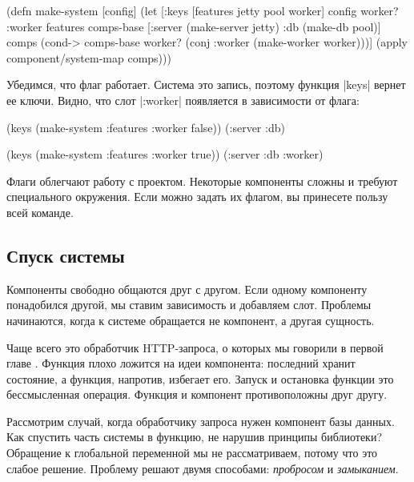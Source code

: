 \begin{english}
  \begin{clojure}
(defn make-system [config]
  (let [{:keys [features jetty pool worker]} config
        {worker? :worker} features
        comps-base [:server (make-server jetty)
                    :db (make-db pool)]
        comps (cond-> comps-base
                worker?
                (conj :worker (make-worker worker)))]
    (apply component/system-map comps)))
  \end{clojure}
\end{english}

Убедимся, что флаг работает. Система это запись, поэтому функция \spverb|keys|
вернет ее ключи. Видно, что слот \spverb|:worker| появляется в зависимости от
флага:

\begin{english}
  \begin{clojure}
(keys (make-system {:features {:worker false}}))
(:server :db)

(keys (make-system {:features {:worker true}}))
(:server :db :worker)
  \end{clojure}
\end{english}

Флаги облегчают работу с проектом. Некоторые компоненты сложны и требуют
специального окружения. Если можно задать их флагом, вы принесете пользу всей
команде.

\subsection{Спуск системы}

Компоненты свободно общаются друг с другом. Если одному компоненту понадобился
другой, мы ставим зависимость и добавляем слот. Проблемы начинаются, когда к
системе обращается не компонент, а другая сущность.

Чаще всего это обработчик HTTP-запроса, о которых мы говорили в первой
главе . Функция плохо ложится на идеи компонента: последний
хранит состояние, а функция, напротив, избегает его. Запуск и остановка функции
это бессмысленная операция. Функция и компонент противоположны друг другу.

Рассмотрим случай, когда обработчику запроса нужен компонент базы данных. Как
спустить часть системы в функцию, не нарушив принципы библиотеки? Обращение к
глобальной переменной мы не рассматриваем, потому что это слабое
решение. Проблему решают двумя способами: \emph{пробросом} и \emph{замыканием}.

